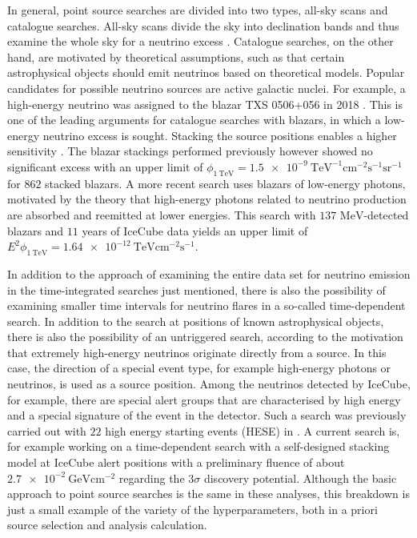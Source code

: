 In general, point source searches are divided into two types, all-sky scans and catalogue searches.
All-sky scans divide the sky into declination bands and thus examine the whole sky for a neutrino excess \cite{all_sky_paper}.
Catalogue searches, on the other hand, are motivated by theoretical assumptions, such as that certain astrophysical objects should emit neutrinos based on theoretical models.
Popular candidates for possible neutrino sources are active galactic nuclei.
For example, a high-energy neutrino was assigned to the blazar TXS 0506+056 in 2018 \cite{txs}.
This is one of the leading arguments for catalogue searches with blazars, in which a low-energy neutrino excess is sought.
Stacking the source positions enables a higher sensitivity \cite{stacking_argument}.
The blazar stackings performed previously however \cite{blazar_stacking_2017} showed no significant excess with an upper limit of $\phi_{\SI{1}{\tera\electronvolt}}=\SI{1.5e-9}{\tera\electronvolt\tothe{-1}\centi\meter\tothe{-2}\second\tothe{-1}\steradian\tothe{-1}}$ for $\num{862}$ stacked blazars.
A more recent search \cite{blazar_stacking_2020} uses blazars of low-energy photons, motivated by the theory that high-energy photons related to neutrino production are absorbed and reemitted at lower energies.
This search with $\num{137}$ $\si{\mega\electronvolt}$-detected blazars and $\num{11}$ years of IceCube data yields an upper limit of $E^2\phi_{\SI{1}{\tera\electronvolt}}=\SI{1.64e-12}{\tera\electronvolt\centi\meter\tothe{-2}\second\tothe{-1}}$.

In addition to the approach of examining the entire data set for neutrino emission in the time-integrated searches just mentioned, there is also the possibility of examining smaller time intervals for neutrino flares in a so-called time-dependent search.
In addition to the search at positions of known astrophysical objects, there is also the possibility of an untriggered search, according to the motivation that extremely high-energy neutrinos originate directly from a source.
In this case, the direction of a special event type, for example high-energy photons or neutrinos, is used as a source position.
Among the neutrinos detected by IceCube, for example, there are special alert groups that are characterised by high energy and a special signature of the event in the detector.
Such a search was previously carried out with $\num{22}$ high energy starting events (HESE) in \cite{thorben}.
A current search is, for example \cite{martina} working on a time-dependent search with a self-designed stacking model at IceCube alert positions with a preliminary fluence of about $\SI{2.7e-2}{\giga\electronvolt\centi\meter\tothe{-2}}$ regarding the $\num{3}\sigma$ discovery potential.
Although the basic approach to point source searches is the same in these analyses, this breakdown is just a small example of the variety of the hyperparameters, both in a priori source selection and analysis calculation.

